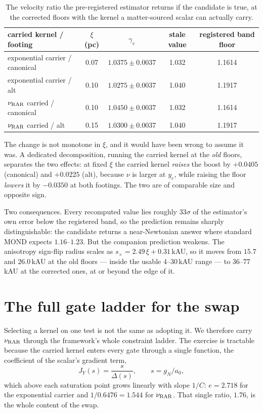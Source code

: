 \documentclass[11pt,letterpaper]{article}
\begin{document}
\begin{table}[h]\centering
\begin{tabular}{lcccc}\toprule
carried kernel / footing & $\xi$ (pc) & $\gamma_v$ & stale value & registered band floor\\\midrule
exponential carrier / canonical & 0.07 & $1.0375\pm0.0037$ & 1.032 & 1.1614\\
exponential carrier / alt & 0.10 & $1.0275\pm0.0037$ & 1.040 & 1.1917\\
$\nu_{\rm RAR}$ carried / canonical & 0.10 & $1.0450\pm0.0037$ & 1.032 & 1.1614\\
$\nu_{\rm RAR}$ carried / alt & 0.15 & $1.0300\pm0.0037$ & 1.040 & 1.1917\\\bottomrule
\end{tabular}
\caption{The velocity ratio the pre-registered estimator returns if the candidate is true, at the corrected floors with the kernel a matter-sourced scalar can actually carry.}\label{tab:gv}
\end{table}

The change is not monotone in $\xi$, and it would have been wrong to assume it was. A dedicated decomposition, running the carried kernel at the \emph{old} floors, separates the two effects: at fixed $\xi$ the carried kernel \emph{raises} the boost by $+0.0405$ (canonical) and $+0.0225$ (alt), because $\nu$ is larger at $y_e$, while raising the floor \emph{lowers} it by $-0.0350$ at both footings. The two are of comparable size and opposite sign.

Two consequences. Every recomputed value lies roughly $33\sigma$ of the estimator's own error below the registered band, so the prediction remains sharply distinguishable: the candidate returns a near-Newtonian answer where standard MOND expects $1.16$--$1.23$. But the companion prediction weakens. The anisotropy sign-flip radius scales as $s_\times=2.49\,\xi+0.31$\,kAU, so it moves from $15.7$ and $26.0$\,kAU at the old floors --- inside the usable $4$--$30$\,kAU range --- to $36$--$77$\,kAU at the corrected ones, at or beyond the edge of it.

\section{The full gate ladder for the swap}
Selecting a kernel on one test is not the same as adopting it. We therefore carry $\nu_{\rm RAR}$ through the framework's whole constraint ladder. The exercise is tractable because the carried kernel enters every gate through a single function, the coefficient of the scalar's gradient term,
\begin{equation}
J_Y(s)=\frac{s}{\Delta(s)},\qquad s=g_N/a_0 ,
\end{equation}
which above each saturation point grows linearly with slope $1/C$: $e=2.718$ for the exponential carrier and $1/0.6476=1.544$ for $\nu_{\rm RAR}$. That single ratio, $1.76$, is the whole content of the swap.
\end{document}
